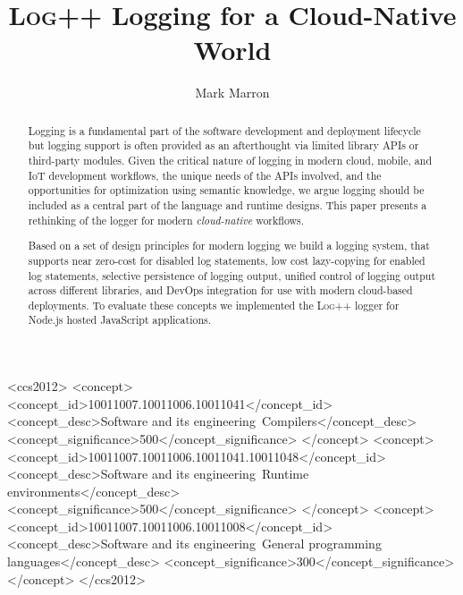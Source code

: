 \documentclass[sigplan,10pt,screen]{acmart}
\newcommand{\projn}{\textsc{Log++}\xspace}
\newcommand{\ourtitle}{\projn Logging for a Cloud-Native World}
\begin{document}



\title{\ourtitle}

\author{Mark Marron}

\begin{abstract} 
Logging is a fundamental part of the software development and
deployment lifecycle but logging support is often provided as an afterthought 
via limited library APIs or third-party modules. Given the critical
nature of logging in modern cloud, mobile, and IoT development workflows, the unique needs of the APIs involved,
and the opportunities for optimization using semantic knowledge, we argue logging should
be included as a central part of the language and runtime designs. This paper
presents a rethinking of the logger for modern \emph{cloud-native} workflows. 

Based on a set of design principles for modern logging we build a logging system,
that supports near zero-cost for disabled log statements, low cost lazy-copying 
for enabled log statements, selective persistence of logging output, unified control 
of logging output across different libraries, and DevOps integration for use with 
modern cloud-based deployments. To evaluate these concepts we implemented the \projn 
logger for Node.js hosted JavaScript applications.
\end{abstract}

\begin{CCSXML}
<ccs2012>
<concept>
<concept_id>10011007.10011006.10011041</concept_id>
<concept_desc>Software and its engineering~Compilers</concept_desc>
<concept_significance>500</concept_significance>
</concept>
<concept>
<concept_id>10011007.10011006.10011041.10011048</concept_id>
<concept_desc>Software and its engineering~Runtime environments</concept_desc>
<concept_significance>500</concept_significance>
</concept>
<concept>
<concept_id>10011007.10011006.10011008</concept_id>
<concept_desc>Software and its engineering~General programming languages</concept_desc>
<concept_significance>300</concept_significance>
</concept>
</ccs2012>
\end{CCSXML}
\end{document}
